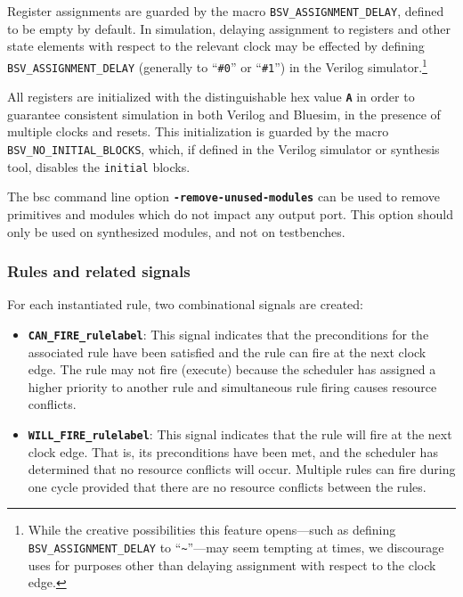 \documentclass{article}
\begin{document}
Register assignments are guarded by the macro \texttt{BSV\_ASSIGNMENT\_DELAY},
defined to be empty by default.  In simulation, delaying assignment to
registers and other state elements with respect to the relevant clock may be
effected by defining \texttt{BSV\_ASSIGNMENT\_DELAY} (generally to
``\texttt{\#0}'' or ``\texttt{\#1}'') in the Verilog simulator.\footnote{While
the creative possibilities this feature opens---such as defining
\texttt{BSV\_ASSIGNMENT\_DELAY} to ``\texttt{\~}''---may seem tempting at
times, we discourage uses for purposes other than delaying assignment with
respect to the clock edge.}

All registers are initialized with the distinguishable hex value {\bf\tt A} in
order to guarantee consistent simulation in both Verilog and Bluesim, in the
presence of multiple clocks and resets.  This initialization is guarded by the
macro \texttt{BSV\_NO\_INITIAL\_BLOCKS}, which, if defined in the Verilog
simulator or synthesis tool, disables the \texttt{initial} blocks.


The bsc command line option {\bf\tt -remove-unused-modules} can be used
to remove primitives and modules which do not impact any output port.
This option should only be used on synthesized modules, and not on
testbenches.


\subsubsection{Rules and related signals}

For each instantiated rule, two combinational signals are created:
\begin{itemize}
\item {\bf\tt CAN\_FIRE\_rulelabel}: This signal indicates that the
  preconditions for the associated rule have been satisfied and the rule
  can fire at the next clock edge. The rule may not fire (execute)
  because the scheduler has assigned a higher priority to another rule
  and simultaneous rule firing causes resource conflicts.
\item {\bf\tt WILL\_FIRE\_rulelabel}: This signal indicates that the
  rule will fire at the next clock edge.  That is, its preconditions
  have been met, and the scheduler has determined that no resource
  conflicts will occur. Multiple rules can fire during one cycle
  provided that there are no resource conflicts between the rules.
\end{itemize}
\end{document}
